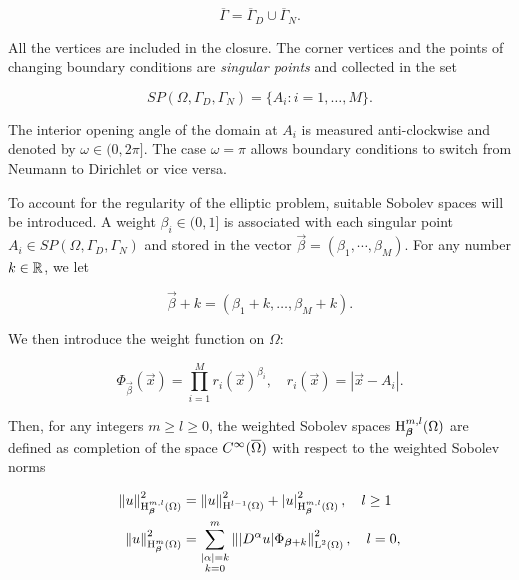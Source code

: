 \documentclass[a4paper,11pt]{article}
\begin{document}
{\begin{equation}\label{eq:weight_function}
    \overline{\Gamma}= \overline{\Gamma}_{D} \cup  \overline{\Gamma}_{N}.
\end{equation}

All the vertices are included in the closure. The corner vertices and the points of changing boundary conditions are \textit{singular points} and collected in the set

\begin{equation}\label{eq:corner_points}
   \textit{SP}(\Omega,\Gamma_{D},\Gamma_{N}) = \{ A_{i} : i = 1,\dots,M \}. 
\end{equation}

The interior opening angle of the domain at $A_{i}$ is measured anti-clockwise and denoted by $\omega \in (0,2\pi]$. The case $\omega = \pi$ allows boundary conditions to switch from Neumann to Dirichlet or vice versa.

To account for the regularity of the elliptic problem, suitable Sobolev spaces will be introduced. A weight $\beta_{i} \in (0,1]$ is associated with each singular point $A_{i} \in \textit{SP}(\Omega,\Gamma_{D},\Gamma_{N})$ and stored in the vector $\vec{\beta} = (\beta_{1},\cdots,\beta_{M})$. For any number $k \in \mathbb R$, we let 

$$ \vec{\beta} + k = (\beta_{1} + k,\dots,\beta_{M} + k).$$

We then introduce the weight function on $\Omega$:

\begin{equation*}
    \Phi_{\vec{\beta}}(\vec{x}) = \prod_{i=1}^{M} r_{i}(\vec{x})^{\beta_{i}}, \quad  r_{i}(\vec{x}) = |\vec{x} - A_{i}|.
\end{equation*}

Then, for any integers $m \geq l \geq 0$, the weighted Sobolev spaces $\operatorname H^{m,l}_{\boldsymbol \beta}(\Omega)$ are defined as completion of the space $C^{\infty}(\overline{\Omega})$ with respect to the weighted Sobolev norms

\begin{equation}\label{eq:weighted_sobolev_norms}
\begin{split}
\left\|u\right\|^{2}_{\operatorname H^{m,l}_{\boldsymbol \beta}(\Omega)} &= \left\|u\right\|^{2}_{\operatorname H^{l-1}(\Omega)} +   \left|u\right|^{2}_{\operatorname H^{m,l}_{\boldsymbol \beta}(\Omega)}, \quad l \geq 1\\ 
\left\|u\right\|^{2}_{\operatorname H^{m}_{\boldsymbol \beta}(\Omega)} &= \sum_{\substack{|\alpha| = k \\ k=0}}^{m} \left\||D^{\alpha}u| \Phi_{\boldsymbol \beta + k}\right\|^{2}_{\operatorname L^{2}(\Omega)}, \quad  l = 0,
\end{split}
\end{equation}


}
\end{document}
